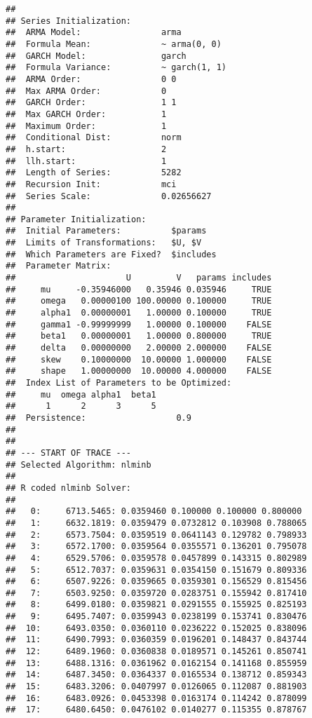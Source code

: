 \documentclass[
]{article}
\begin{document}
\begin{verbatim}
## 
## Series Initialization:
##  ARMA Model:                arma
##  Formula Mean:              ~ arma(0, 0)
##  GARCH Model:               garch
##  Formula Variance:          ~ garch(1, 1)
##  ARMA Order:                0 0
##  Max ARMA Order:            0
##  GARCH Order:               1 1
##  Max GARCH Order:           1
##  Maximum Order:             1
##  Conditional Dist:          norm
##  h.start:                   2
##  llh.start:                 1
##  Length of Series:          5282
##  Recursion Init:            mci
##  Series Scale:              0.02656627
## 
## Parameter Initialization:
##  Initial Parameters:          $params
##  Limits of Transformations:   $U, $V
##  Which Parameters are Fixed?  $includes
##  Parameter Matrix:
##                      U         V   params includes
##     mu     -0.35946000   0.35946 0.035946     TRUE
##     omega   0.00000100 100.00000 0.100000     TRUE
##     alpha1  0.00000001   1.00000 0.100000     TRUE
##     gamma1 -0.99999999   1.00000 0.100000    FALSE
##     beta1   0.00000001   1.00000 0.800000     TRUE
##     delta   0.00000000   2.00000 2.000000    FALSE
##     skew    0.10000000  10.00000 1.000000    FALSE
##     shape   1.00000000  10.00000 4.000000    FALSE
##  Index List of Parameters to be Optimized:
##     mu  omega alpha1  beta1 
##      1      2      3      5 
##  Persistence:                  0.9 
## 
## 
## --- START OF TRACE ---
## Selected Algorithm: nlminb 
## 
## R coded nlminb Solver: 
## 
##   0:     6713.5465: 0.0359460 0.100000 0.100000 0.800000
##   1:     6632.1819: 0.0359479 0.0732812 0.103908 0.788065
##   2:     6573.7504: 0.0359519 0.0641143 0.129782 0.798933
##   3:     6572.1700: 0.0359564 0.0355571 0.136201 0.795078
##   4:     6529.5706: 0.0359578 0.0457899 0.143315 0.802989
##   5:     6512.7037: 0.0359631 0.0354150 0.151679 0.809336
##   6:     6507.9226: 0.0359665 0.0359301 0.156529 0.815456
##   7:     6503.9250: 0.0359720 0.0283751 0.155942 0.817410
##   8:     6499.0180: 0.0359821 0.0291555 0.155925 0.825193
##   9:     6495.7407: 0.0359943 0.0238199 0.153741 0.830476
##  10:     6493.0350: 0.0360110 0.0236222 0.152025 0.838096
##  11:     6490.7993: 0.0360359 0.0196201 0.148437 0.843744
##  12:     6489.1960: 0.0360838 0.0189571 0.145261 0.850741
##  13:     6488.1316: 0.0361962 0.0162154 0.141168 0.855959
##  14:     6487.3450: 0.0364337 0.0165534 0.138712 0.859343
##  15:     6483.3206: 0.0407997 0.0126065 0.112087 0.881903
##  16:     6483.0926: 0.0453398 0.0163174 0.114242 0.878099
##  17:     6480.6450: 0.0476102 0.0140277 0.115355 0.878767

\end{verbatim}
\end{document}
